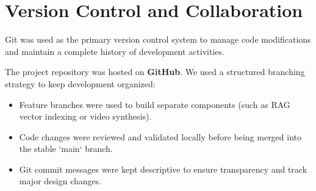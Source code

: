 \section{Version Control and Collaboration}

Git was used as the primary version control system to manage code modifications and maintain a complete history of development activities.

The project repository was hosted on \textbf{GitHub}. We used a structured branching strategy to keep development organized:
\begin{itemize}
    \item Feature branches were used to build separate components (such as RAG vector indexing or video synthesis).
    \item Code changes were reviewed and validated locally before being merged into the stable `main` branch.
    \item Git commit messages were kept descriptive to ensure transparency and track major design changes.
\end{itemize}